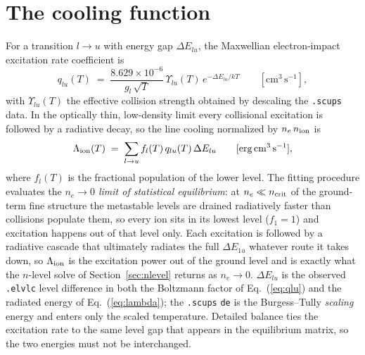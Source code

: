 \documentclass[english,a4paper]{my_memo}
\newcommand{\ergcm}{\mathrm{erg\,cm^{3}\,s^{-1}}}
\newcommand{\Lam}{\Lambda}
\newcommand{\code}[1]{\texttt{#1}}
\begin{document}
\section{The cooling function}
For a transition $l\to u$ with energy gap $\Delta E_{lu}$, the Maxwellian
electron-impact excitation rate coefficient is
\begin{equation}
  q_{lu}(T) \;=\; \frac{8.629\times 10^{-6}}{g_l\,\sqrt{T}}\,
  \Upsilon_{lu}(T)\, e^{-\Delta E_{lu}/kT}
  \qquad [\mathrm{cm^{3}\,s^{-1}}],
  \label{eq:qlu}
\end{equation}
with $\Upsilon_{lu}(T)$ the effective collision strength obtained by
descaling the \code{.scups} data.  In the optically thin, low-density
limit every collisional excitation is followed by a radiative decay, so
the line cooling normalized by $n_e\,n_{\rm ion}$ is
\begin{equation}
  \Lam_{\rm ion}(T) \;=\; \sum_{l\to u} f_l(T)\, q_{lu}(T)\, \Delta E_{lu}
  \qquad [\ergcm],
  \label{eq:lambda}
\end{equation}
where $f_l(T)$ is the fractional population of the lower level.  The
fitting procedure evaluates the \emph{$n_e \to 0$ limit of statistical
equilibrium}: at $n_e \ll n_{\rm crit}$ of the ground-term fine
structure the metastable levels are drained radiatively faster than
collisions populate them, so every ion sits in its lowest level
($f_1 = 1$) and excitation happens out of that level only.  Each
excitation is followed by a radiative cascade that ultimately radiates
the full $\Delta E_{1u}$ whatever route it takes down, so
$\Lam_{\rm ion}$ is the excitation power out of the ground level and is
exactly what the $n$-level solve of Section~\ref{sec:nlevel} returns as $n_e \to 0$.
$\Delta E_{lu}$ is the observed \code{.elvlc} level difference in both
the Boltzmann factor of Eq.~(\ref{eq:qlu}) and the radiated energy of
Eq.~(\ref{eq:lambda}); the \code{.scups} \code{de} is the
Burgess--Tully \emph{scaling} energy and enters only the scaled
temperature.  Detailed balance ties the excitation rate to the same
level gap that appears in the equilibrium matrix, so the two energies
must not be interchanged.
\end{document}
